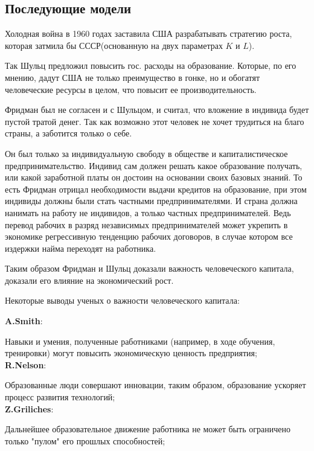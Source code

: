 \documentclass[reqno]{article}
\theoremstyle{definition}
\theoremstyle{definition}
\theoremstyle{definition}
\theoremstyle{definition}
\theoremstyle{definition}
\theoremstyle{definition}
\theoremstyle{definition}
\theoremstyle{definition}
\theoremstyle{definition}
\begin{document}
	\subsection{Последующие модели}
	Холодная война в 1960 годах заставила США разрабатывать стратегию роста, которая затмила бы СССР(основанную на двух параметрах $K$ и $L$).
	
	Так Шульц предложил повысить гос. расходы на образование. Которые, по его мнению, дадут США не только преимущество в гонке, но и обогатят человеческие ресурсы в целом, что повысит ее производительность.
	
	Фридман был не согласен и с Шульцом, и считал, что вложение в индивида будет пустой тратой денег. Так как возможно этот человек не хочет трудиться на благо страны, а  заботится только о себе.
	
	Он был только за индивидуальную свободу в обществе и капиталистическое предпринимательство. Индивид сам должен решать какое образование получать, или какой заработной платы он достоин на основании своих базовых знаний. То есть Фридман отрицал необходимости выдачи кредитов на образование, при этом индивиды должны были стать частными предпринимателями. И страна должна нанимать на работу не индивидов, а только частных предпринимателей. Ведь перевод рабочих в разряд независимых предпринимателей может укрепить в экономике регрессивную тенденцию рабочих договоров, в случае котором все издержки найма переходят на работника.  
	
	Таким образом Фридман и Шульц доказали важность человеческого капитала, доказали его влияние на экономический рост.
	
	\begin{center}
		Некоторые выводы ученых о важности человеческого капитала:
	\end{center}
	
	\textbf{A.Smith}: 
	
	Навыки и умения, полученные работниками (например, в ходе обучения, тренировки) могут повысить экономическую ценность предприятия;\\
	
	\textbf{R.Nelson}: 
	
	Образованные люди совершают инновации, таким образом, образование ускоряет процесс развития технологий;\\
	
	\textbf{Z.Griliches}:
	
	Дальнейшее образовательное движение работника не может быть ограничено только "пулом" его прошлых способностей;\\
	
\end{document}
